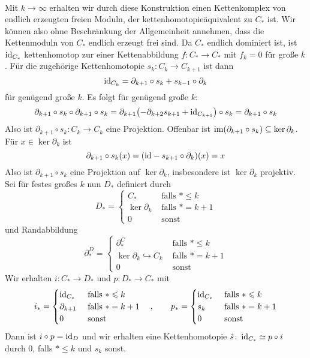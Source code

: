 \begin{beweis}
\begin{align}
	\end{align}
	Mit $k \to \infty$ erhalten wir durch diese Konstruktion einen Kettenkomplex von endlich erzeugten freien Moduln, der kettenhomotopieäquivalent zu $C_*$ ist.
	Wir können also ohne Beschränkung der Allgemeinheit annehmen, dass die Kettenmoduln von $C_*$ endlich erzeugt frei sind.
	Da $C_*$ endlich dominiert ist, ist $\operatorname{id}_{C_*}$ kettenhomotop zur einer Kettenabbildung $f \colon C_* \to C_*$ mit $f_k =0$ für große $k$.
	Für die zugehörige Kettenhomotopie $s_k \colon C_k \to C_{k+1}$ ist dann
	\[
		{\operatorname{id}_{C_k}} = \partial_{k+1} \circ s_k + s_{k-1} \circ \partial_k
	\]
	für genügend große $k$.
	Es folgt für genügend große $k$:
	\[
		\partial_{k+1} \circ s_k \circ \partial_{k+1} \circ s_k = \partial_{k+1}\enbrace*{-\partial_{k+2} s_{k+1} + {\id_{C_{k+1}}}} \circ s_k = \partial_{k+1} \circ s_k
	\]
	Also ist $\partial_{k+1} \circ s_k \colon C_k \to C_k$ eine Projektion.
	Offenbar ist $\operatorname{im} (\partial_{k+1} \circ s_k) \subseteq \ker \partial_k$.
	Für $x \in \ker \partial_k$ ist 
	\[
		\partial_{k+1} \circ s_k(x) = \enbrace*{{\id} - s_{k+1} \circ \partial_k} (x) =x
	\]
	Also ist $\partial_{k+1} \circ s_k$ eine Projektion auf $\ker \partial_k$, insbesondere ist $\ker \partial_k$ projektiv.
	Sei für festes großes $k$ nun $D_*$ definiert durch
	\[
		D_* = \begin{cases}
			C_* &\text{ falls }* \le k\\
			\ker \partial_k &\text{ falls } *=k+1 \\
			0 &\text{ sonst} 
		\end{cases}
	\]
	und Randabbildung
	\[
		\partial^D_* = \begin{cases}
			\partial^C_* &\text{ falls }*\le k\\
			\ker \partial_k \hookrightarrow C_k &\text{ falls } *=k+1 \\
			0 &\text{ sonst} 
		\end{cases}
	\]
	Wir erhalten $i \colon C_* \to D_*$ und $p \colon D_* \to C_*$ mit 
	\[
		i_* = \begin{cases}
			{\operatorname{id}_{C_*}} &\text{ falls }* \leqslant k\\
			\partial_{k+1} &\text{ falls } * = k+1 \\
			0 & \text{ sonst} 
		\end{cases} \quad , \qquad 
		p_* = \begin{cases}
			\operatorname{id}_{C_*} &\text{ falls } * \leqslant k\\
			s_k &\text{ falls } * =k+1 \\
			0 & \text{ sonst} 
		\end{cases}
	\]
	Dann ist $i \circ p = {\operatorname{id}_D}$ und wir erhalten eine Kettenhomotopie $\hat{s} \colon \operatorname{id}_{C_*} \simeq p \circ i$ durch $0$, falls $* \le k$ und $s_k$ sonst.
\end{beweis}
\newpage

